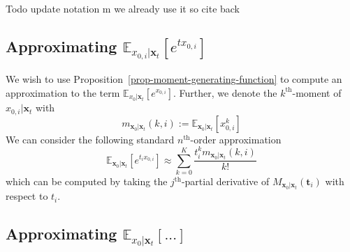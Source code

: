 Todo
update notation 
m we already use it so cite back

\subsection{Approximating $\mathbb{E}_{{{x}_{0, i}\vert \mathbf{x}_t}}[e^{t x_{0,i}}]$}
We wish to use Proposition~\ref{prop-moment-generating-function} to compute an approximation to the term $\mathbb{E}_{{{x}_0\vert \mathbf{x}_t}}[e^{x_{0,i}}]$. 
Further, we denote the $k^{\text{th}}$-moment of $x_{0,i}\vert \mathbf{x}_t$ with
\begin{equation}
    m_{\mathbf{x}_0|\mathbf{x}_t}(k,i) := \mathbb{E}_{{\mathbf{x}_0\vert \mathbf{x}_t}}[x_{0,i}^k]
\end{equation}
We can consider the following standard $n^{\text{th}}$-order approximation
\begin{equation}
\mathbb{E}_{{\mathbf{x}_0\vert \mathbf{x}_t}}[e^{t_{i}x_{0,i}}] \approx \sum_{k=0}^{K} \frac{t_i^{k}m_{\mathbf{x}_0|\mathbf{x}_t}(k,i)}{k!}
\end{equation}
which can be computed by taking the $j^{\text{th}}$-partial derivative of $M_{\mathbf{x}_{0}\vert\mathbf{x}_{t}}(\mathbf{t}_{i})$ with respect to $t_{i}$. 

\subsection{Approximating $\mathbb{E}_{{{x}_0\vert \mathbf{x}_t}}[...]$}